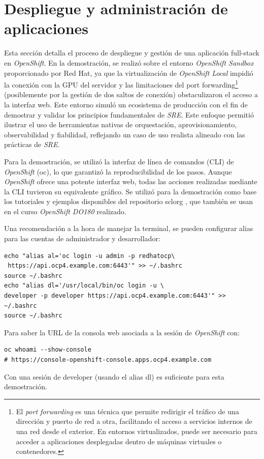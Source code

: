 \section{Despliegue y administración de aplicaciones}
Esta sección detalla el proceso de despliegue y gestión de una aplicación full-stack en \textit{OpenShift}. En la demostración, se realizó sobre el entorno \textit{OpenShift Sandbox} proporcionado por Red Hat, ya que la virtualización de \textit{OpenShift Local} impidió la conexión con la GPU del servidor y las limitaciones del port forwarding\footnote{El \textit{port forwarding} es una técnica que permite redirigir el tráfico de una dirección y puerto de red a otra, facilitando el acceso a servicios internos de una red desde el exterior. En entornos virtualizados, puede ser necesario para acceder a aplicaciones desplegadas dentro de máquinas virtuales o contenedores.} (posiblemente por la gestión de dos saltos de conexión) obstaculizaron el acceso a la interfaz web. Este entorno simuló un ecosistema de producción con el fin de demostrar y validar los principios fundamentales de \textit{SRE}. Este enfoque permitió ilustrar el uso de herramientas nativas de orquestación, aprovisionamiento, observabilidad y fiabilidad, reflejando un caso de uso realista alineado con las prácticas de \textit{SRE}.

Para la demostración, se utilizó la interfaz de línea de comandos (CLI) de \textit{OpenShift} (oc), lo que garantizó la reproducibilidad de los pasos. Aunque \textit{OpenShift} ofrece una potente interfaz web, todas las acciones realizadas mediante la CLI tuvieron su equivalente gráfico. Se utilizó para la demostración como base los tutoriales y ejemplos disponibles del repositorio sclorg \cite{ref62}, que también se usan en el curso \textit{OpenShift DO180} realizado.

Una recomendación a la hora de manejar la terminal, se pueden configurar alias para las cuentas de administrador y desarrollador:
\begin{verbatim}
echo "alias al='oc login -u admin -p redhatocp\
 https://api.ocp4.example.com:6443'" >> ~/.bashrc
source ~/.bashrc
echo "alias dl='/usr/local/bin/oc login -u \
developer -p developer https://api.ocp4.example.com:6443'" >> ~/.bashrc
source ~/.bashrc
\end{verbatim}

Para saber la URL de la consola web asociada a la sesión de \textit{OpenShift} con:
\begin{verbatim}
oc whoami --show-console
# https://console-openshift-console.apps.ocp4.example.com

\end{verbatim}
Con una sesión de developer (usando el alias dl) es suficiente para esta demostración.

